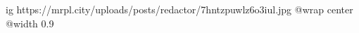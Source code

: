  
 
 
 
 

\ifcmt
	ig https://mrpl.city/uploads/posts/redactor/7hntzpuwlz6o3iul.jpg
  @wrap center
  @width 0.9
\fi
